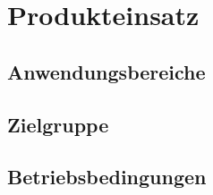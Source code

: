 \section{Produkteinsatz}

\subsection{Anwendungsbereiche}

\subsection{Zielgruppe}

\subsection{Betriebsbedingungen}
